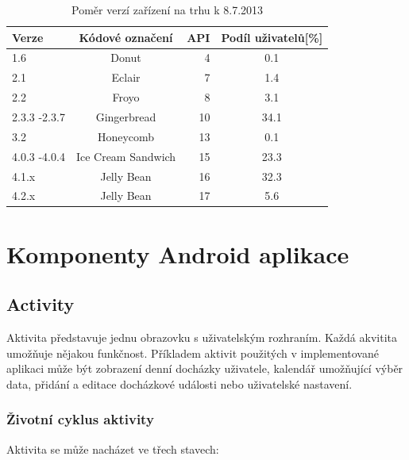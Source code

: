 \documentclass{diplomka}
\begin{document}
\begin{table}[H]\footnotesize
\begin{center}
  \begin{tabular}{| l | c | r | c |}
    \hline
Verze&Kódové označení&API&Podíl uživatelů[\%]\\ \hline
  1.6&Donut&4&0.1\\ \hline
2.1&Eclair&7&1.4\\ \hline
2.2&Froyo&8&3.1\\ \hline
2.3.3 -2.3.7&Gingerbread&10&34.1\\ \hline
3.2&Honeycomb&13&0.1\\ \hline
4.0.3 -4.0.4&Ice Cream Sandwich&15&23.3\\ \hline
4.1.x&Jelly Bean&16&32.3\\ \hline
4.2.x&Jelly Bean&17&5.6\\ \hline
  \end{tabular}
\end{center}
\caption{Poměr verzí zařízení na trhu k 8.7.2013\cite{share}}
\label{tab:share}
\end{table}



\section{Komponenty Android aplikace}

\subsection{Activity}
Aktivita představuje jednu obrazovku s uživatelským rozhraním. Každá akvitita umožňuje nějakou funkčnost. Příkladem aktivit použitých v implementované aplikaci může být zobrazení denní docházky uživatele, kalendář umožňující výběr data, přidání a editace docházkové události nebo uživatelské nastavení.

\subsubsection*{Životní cyklus aktivity}
Aktivita se může nacházet ve třech stavech:
\end{document}
